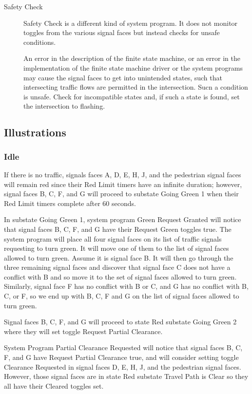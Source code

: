 \documentclass[letterpaper,twoside]{article}
\begin{document}
\begin{description}
\item[Safety Check]

Safety Check is a different kind of system program.  It does not
monitor toggles from the various signal faces but instead checks
for unsafe conditions.  
  
An error in the description of the finite state machine, or an error
in the implementation of the finite state machine driver or the
system programs may cause the signal faces to get into unintended
states, such that intersecting traffic flows are permitted in the
intersection.  Sucn a condition is unsafe.  Check for incompatible
states and, if such a state is found, set the intersection to flashing.

\end{description}

\subsection{Illustrations}

\subsubsection{Idle}

If there is no traffic, signals faces A, D, E, H, J, and the
pedestrian signal faces will remain red
since their Red Limit timers have an infinite duration; however,
signal faces B, C, F, and G will proceed to substate Going Green 1 when
their Red Limit timers complete after 60 seconds.

In substate Going Green 1, system program Green Request Granted will notice
that signal faces B, C, F, and G have their Request Green toggles true.
The system program will place all four signal faces on its list of traffic
signals requesting to turn green.  It will move one of them to the list
of signal faces allowed to turn green.  Assume it is signal face B.
It will then go through the three
remaining signal faces and discover that signal face C does not have
a conflict with B and so move it to the set of signal faces allowed
to turn green.  Similarly, signal face F has no conflict with B or C,
and G has no conflict with B, C, or F, so we end up with B, C, F and G
on the list of signal faces allowed to turn green.

Signal faces B, C, F, and G will proceed to state Red
substate Going Green 2 where they will set toggle Request Partial Clearance.

System Program Partial Clearance Requested will notice that signal faces
B, C, F, and G have Request Partial Clearance true,
and will consider setting toggle Clearance
Requested in signal faces D, E, H, J, and the pedestrian signal faces.
However, those signal faces
are in state Red substate Travel Path is Clear so they all have their
Cleared toggles set.
\end{document}
